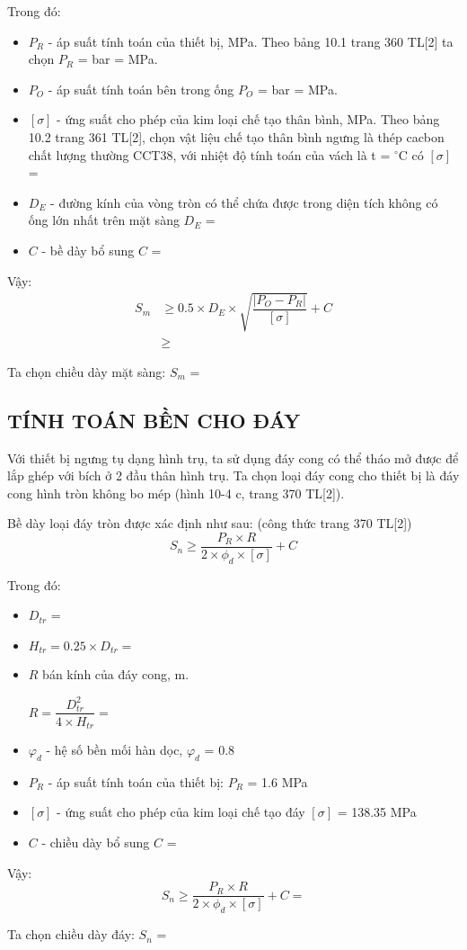 Trong đó:
\begin{itemize}
	\item $P_{R}$ - áp suất tính toán của thiết bị, MPa. Theo bảng 10.1 trang 360 TL[2] ta chọn $P_{R}$ =  bar =  MPa.
	\item $P_{O}$ - áp suất tính toán bên trong ống $P_{O}$ =  bar =  MPa.
	\item $[\sigma]$ - ứng suất cho phép của kim loại chế tạo thân bình, MPa. Theo bảng 10.2 trang 361 TL[2], chọn vật liệu chế tạo thân bình ngưng là thép cacbon chất lượng thường CCT38, với nhiệt độ tính toán của vách là t = $^{\circ}$C có $[\sigma]$ = 	
	\item $D_{E}$ - đường kính của vòng tròn có thể chứa được trong diện tích không có ống lớn nhất trên mặt sàng $D_{E}$ = 
	\item $C$ - bề dày bổ sung $C$ = 
\end{itemize}

Vậy:
\begin{equation*}
\begin{split}
		S_{m} &\geq 0.5\times D_{E}\times \sqrt{\dfrac{|P_{O} - P_{R}|}{[\sigma]}} + C\\
		&\geq 
\end{split}
\end{equation*}

Ta chọn chiều dày mặt sàng: $S_{m}$ = 

\subsection{TÍNH TOÁN BỀN CHO ĐÁY}
Với thiết bị ngưng tụ dạng hình trụ, ta sử dụng đáy cong có thể tháo mở được để lắp ghép với bích ở 2 đầu thân hình trụ. Ta chọn loại đáy cong cho thiết bị là đáy cong hình tròn không bo mép (hình 10-4 c, trang 370 TL[2]).

Bề dày loại đáy tròn được xác định như sau: (công thức trang 370 TL[2])
\begin{equation*}
	S_{n} \geq \dfrac{P_{R}\times R}{2\times \phi_{d}\times[\sigma]} + C
\end{equation*}

Trong đó:
\begin{itemize}
	\item $D_{tr}$ = 
	\item $H_{tr} = 0.25\times D_{tr} = $
	\item $R$ bán kính của đáy cong, m.
	
	$R = \dfrac{D_{tr}^2}{4\times H_{tr}} = $ 
	\item $ \varphi_{d} $ - hệ số bền mối hàn dọc, $\varphi_{d}$ = 0.8
	\item $P_{R}$ - áp suất tính toán của thiết bị: $P_{R}$ = 1.6 MPa
	\item $[\sigma]$ - ứng suất cho phép của kim loại chế tạo đáy $[\sigma]$ = 138.35 MPa 
	\item $C$ - chiều dày bổ sung $C$ = 
\end{itemize}

Vậy: 
\begin{equation*}
	S_{n} \geq \dfrac{P_{R}\times R}{2\times \phi_{d}\times[\sigma]} + C = 
\end{equation*}

Ta chọn chiều dày đáy: $S_{n}$ = 
